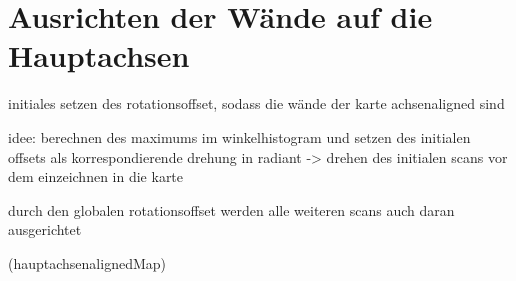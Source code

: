 \section{Ausrichten der Wände auf die Hauptachsen}

initiales setzen des rotationsoffset, sodass die wände der karte achsenaligned sind

idee: berechnen des maximums im winkelhistogram und setzen des initialen offsets als korrespondierende drehung in radiant -> drehen des initialen scans vor dem einzeichnen in die karte

durch den globalen rotationsoffset werden alle weiteren scans auch daran ausgerichtet

(hauptachsenalignedMap)